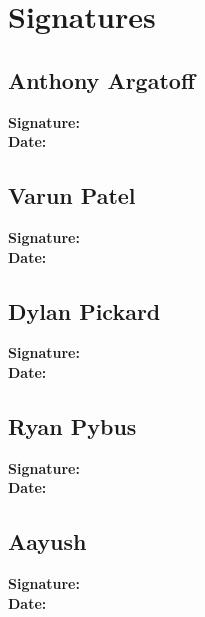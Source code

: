\documentclass{article}
\begin{document}
\pagebreak

\section*{Signatures}

\subsection*{Anthony Argatoff}
\textbf{Signature:} \\[10pt]
\textbf{Date:}

\subsection*{Varun Patel}
\textbf{Signature:} \\[10pt]
\textbf{Date:}

\subsection*{Dylan Pickard}
\textbf{Signature:} \\[10pt]
\textbf{Date:}

\subsection*{Ryan Pybus}
\textbf{Signature:} \\[10pt]
\textbf{Date:}

\subsection*{Aayush}
\textbf{Signature:} \\[10pt]
\textbf{Date:}
\end{document}
